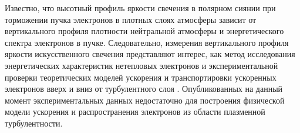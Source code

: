 \documentclass[12pt,a4paper]{article}
\begin{document}
Известно, что высотный профиль яркости свечения в полярном сиянии при торможении пучка электронов в плотных слоях атмосферы зависит от вертикального профиля плотности нейтральной атмосферы и энергетического спектра электронов в пучке. Следовательно, измерения вертикального профиля яркости искусственного свечения представляют интерес, как метод исследования энергетических характеристик нетепловых электронов и экспериментальной проверки теоретических моделей ускорения и транспортировки ускоренных электронов вверх и вниз от турбулентного слоя \cite{Vaskov1983,Gurevich1985}.
Опубликованных на данный момент экспериментальных данных \cite{HASLETT1974, Gustavsson2001, Gustavsson2008, Pedersen2011} недостаточно для построения физической модели ускорения и распространения электронов из области плазменной турбулентности.


\end{document}
